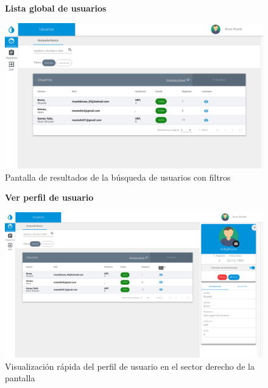 				\begin{figure}[H]
					\hspace*{1cm}\raggedright\large\textbf{Lista global de usuarios}\par\medskip
					\centering
						\includegraphics[width=1\textwidth]{Screenshots/web/usuarioListar.png}
							\caption{Pantalla de resultados de la búsqueda de usuarios con filtros}
				\end{figure}

			
				\begin{figure}[H]
					\hspace*{1cm}\raggedright\large\textbf{Ver perfil de usuario}\par\medskip
					\centering
						\includegraphics[width=1\textwidth]{Screenshots/web/usuarioVer.png}
							\caption{Visualización rápida del perfil de usuario en el sector derecho de la pantalla}
				\end{figure}
